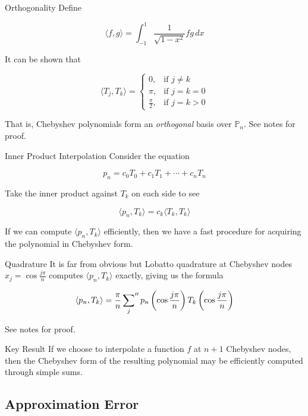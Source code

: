 \documentclass[pdf]{beamer}
\begin{document}
\begin{frame}{Orthogonality}
  Define

  \[ \langle f, g \rangle = \int_{-1}^1 \frac{1}{\sqrt{1-x^2}}fg \,dx \]

  It can be shown that
  
  \[ \langle T_j, T_k \rangle = \left\{
    \begin{array}{ll}
        0, & \text{if } j \neq k\\
        \pi, & \text{if } j = k = 0\\
        \frac{\pi}{2}, & \text{if } j = k > 0
    \end{array}
  \right.
  \]

  That is, Chebyshev polynomials form an \emph{orthogonal} basis
  over $\mathbb{P}_n$. See notes for proof.
\end{frame}


\begin{frame}{Inner Product Interpolation}
  Consider the equation

  \[ p_n = c_0T_0 + c_1T_1 + \cdots + c_nT_n \]

  Take the inner product against $T_k$ on each side to see

  \[ \langle p_n, T_k \rangle = c_k \langle T_k, T_k \rangle \]

  If we can compute $\langle p_n, T_k \rangle$ efficiently, then we have a fast
  procedure for acquiring the polynomial in Chebyshev form.
\end{frame}

\begin{frame}{Quadrature}
  It is far from obvious but Lobatto quadrature at
  Chebyshev nodes $x_j = \cos \frac{j\pi}{n}$ computes $\langle p_n, T_k \rangle$ exactly,
  giving us the formula

  \[ \langle p_n, T_k \rangle = \frac{\pi}{n} \sideset{}{''}\sum_j p_n\left(\cos \frac{j\pi}{n}\right) T_k\left(\cos \frac{j\pi}{n}\right) \]

  See notes for proof.
\end{frame}

\begin{frame}{Key Result}
  If we choose to interpolate a function $f$ at $n+1$ Chebyshev nodes, then the
  Chebyshev form of the resulting polynomial may be efficiently computed through
  simple sums.
\end{frame}

\subsection{Approximation Error}
\end{document}
